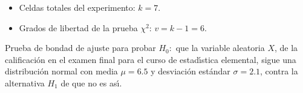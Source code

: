\begin{solucion}
\begin{datos}
\begin{itemize}
\begin{center}
   \end{center}
   \item Celdas totales del experimento: $k=7$.
   \item Grados de libertad de la prueba $\chi^2$: $v= k-1 = 6$.
  \end{itemize}
 \end{datos}
 
 \begin{hipotesis}
  Prueba de bondad de ajuste para probar $H_0:$
  que la variable aleatoria $X$, de la calificaci\'on en el examen final
  para el curso de estad\'{\i}stica elemental,
  sigue una distribuci\'on normal
  con media $\mu=6.5$ y desviaci\'on est\'andar $\sigma = 2.1$,
  contra la alternativa $H_1$ de que no es as\'{\i}.
 \end{hipotesis}


\end{solucion}
